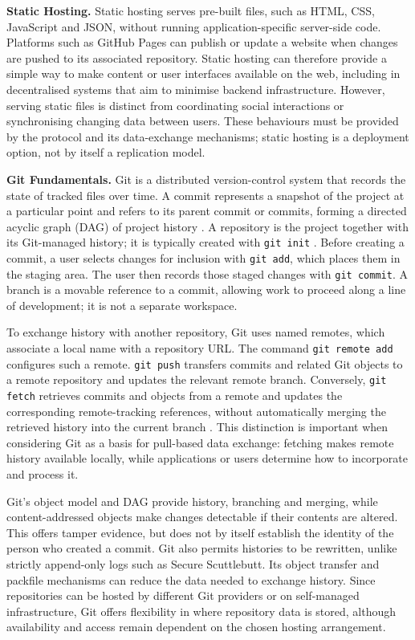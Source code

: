 \textbf{Static Hosting.}
Static hosting serves pre-built files, such as HTML, CSS, JavaScript and JSON, without running application-specific server-side code. Platforms such as GitHub Pages can publish or update a website when changes are pushed to its associated repository. Static hosting can therefore provide a simple way to make content or user interfaces available on the web, including in decentralised systems that aim to minimise backend infrastructure. However, serving static files is distinct from coordinating social interactions or synchronising changing data between users. These behaviours must be provided by the protocol and its data-exchange mechanisms; static hosting is a deployment option, not by itself a replication model.
    
\textbf{Git Fundamentals.}
Git is a distributed version-control system that records the state of tracked files over time. A commit represents a snapshot of the project at a particular point and refers to its parent commit or commits, forming a directed acyclic graph (DAG) of project history \cite{git_what_is_git}. A repository is the project together with its Git-managed history; it is typically created with \texttt{git init} \cite{git_repository_medium}. Before creating a commit, a user selects changes for inclusion with \texttt{git add}, which places them in the staging area. The user then records those staged changes with \texttt{git commit}. A branch is a movable reference to a commit, allowing work to proceed along a line of development; it is not a separate workspace.

To exchange history with another repository, Git uses named remotes, which associate a local name with a repository URL. The command \texttt{git remote add} configures such a remote. \texttt{git push} transfers commits and related Git objects to a remote repository and updates the relevant remote branch. Conversely, \texttt{git fetch} retrieves commits and objects from a remote and updates the corresponding remote-tracking references, without automatically merging the retrieved history into the current branch \cite{git_docs}. This distinction is important when considering Git as a basis for pull-based data exchange: fetching makes remote history available locally, while applications or users determine how to incorporate and process it.

Git's object model and DAG provide history, branching and merging, while content-addressed objects make changes detectable if their contents are altered. This offers tamper evidence, but does not by itself establish the identity of the person who created a commit. Git also permits histories to be rewritten, unlike strictly append-only logs such as Secure Scuttlebutt. Its object transfer and packfile mechanisms can reduce the data needed to exchange history. Since repositories can be hosted by different Git providers or on self-managed infrastructure, Git offers flexibility in where repository data is stored, although availability and access remain dependent on the chosen hosting arrangement.

